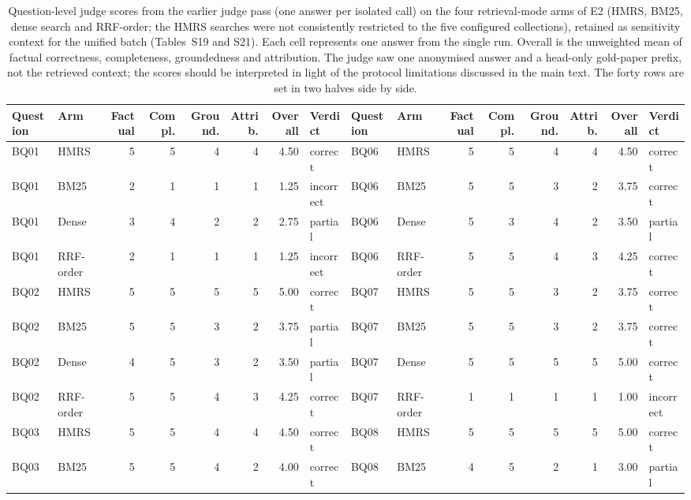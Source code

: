 \begin{table}[!t]
\centering
\scriptsize
\setlength{\tabcolsep}{3pt}
\renewcommand{\arraystretch}{1.0}
\caption{Question-level judge scores from the earlier judge pass
(one answer per isolated call) on the four retrieval-mode arms of E2
(HMRS, BM25, dense search and RRF-order; the HMRS searches were not
consistently restricted to the five configured collections), retained as
sensitivity context for the unified
batch (Tables~S19 and S21). Each cell represents one answer
from the single run. Overall is the unweighted mean of factual correctness,
completeness, groundedness and attribution. The judge saw one anonymised
answer and a head-only gold-paper prefix, not the retrieved context; the
scores should be interpreted in light of the protocol limitations discussed
in the main text. The forty rows are set in two halves side by side.}
\label{tab:baseline-quality-question-level}
\begin{tabular}{@{}llrrrrrl@{\hskip 14pt}llrrrrrl@{}}
\toprule
Question & Arm & Factual & Compl. & Ground. & Attrib. & Overall & Verdict &
Question & Arm & Factual & Compl. & Ground. & Attrib. & Overall & Verdict\\
\midrule
BQ01 & HMRS & 5 & 5 & 4 & 4 & 4.50 & correct & BQ06 & HMRS & 5 & 5 & 4 & 4 & 4.50 & correct\\
BQ01 & BM25 & 2 & 1 & 1 & 1 & 1.25 & incorrect & BQ06 & BM25 & 5 & 5 & 3 & 2 & 3.75 & correct\\
BQ01 & Dense & 3 & 4 & 2 & 2 & 2.75 & partial & BQ06 & Dense & 5 & 3 & 4 & 2 & 3.50 & partial\\
BQ01 & RRF-order & 2 & 1 & 1 & 1 & 1.25 & incorrect & BQ06 & RRF-order & 5 & 5 & 4 & 3 & 4.25 & correct\\
\addlinespace[1pt]
BQ02 & HMRS & 5 & 5 & 5 & 5 & 5.00 & correct & BQ07 & HMRS & 5 & 5 & 3 & 2 & 3.75 & correct\\
BQ02 & BM25 & 5 & 5 & 3 & 2 & 3.75 & partial & BQ07 & BM25 & 5 & 5 & 3 & 2 & 3.75 & correct\\
BQ02 & Dense & 4 & 5 & 3 & 2 & 3.50 & partial & BQ07 & Dense & 5 & 5 & 5 & 5 & 5.00 & correct\\
BQ02 & RRF-order & 5 & 5 & 4 & 3 & 4.25 & correct & BQ07 & RRF-order & 1 & 1 & 1 & 1 & 1.00 & incorrect\\
\addlinespace[1pt]
BQ03 & HMRS & 5 & 5 & 4 & 4 & 4.50 & correct & BQ08 & HMRS & 5 & 5 & 5 & 5 & 5.00 & correct\\
BQ03 & BM25 & 5 & 5 & 4 & 2 & 4.00 & correct & BQ08 & BM25 & 4 & 5 & 2 & 1 & 3.00 & partial\\

\end{tabular}
\end{table}
